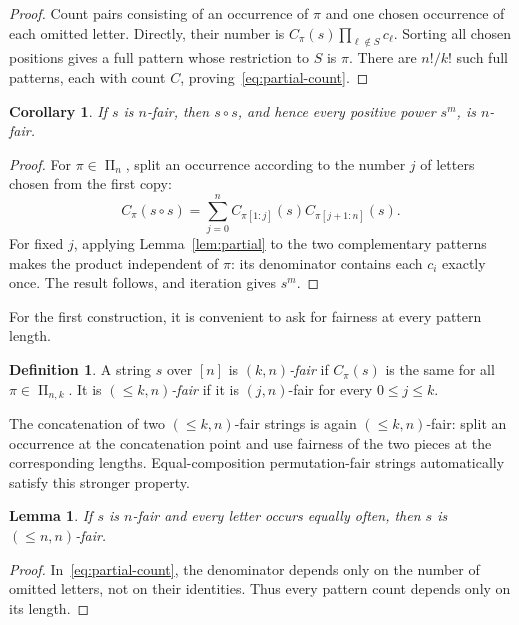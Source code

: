\documentclass[11pt]{article}
\newtheorem{lemma}[theorem]{Lemma}
\newtheorem{corollary}[theorem]{Corollary}
\theoremstyle{definition}
\newtheorem{definition}[theorem]{Definition}
\theoremstyle{remark}
\newcommand{\PiSet}{\mathop{\Pi}}
\newcommand{\concat}{\mathbin{\circ}}
\begin{document}
\begin{proof}
Count pairs consisting of an occurrence of \(\pi\) and one chosen occurrence
of each omitted letter.  Directly, their number is
\(C_\pi(s)\prod_{\ell\notin S}c_\ell\).  Sorting all chosen positions gives a
full pattern whose restriction to \(S\) is \(\pi\).  There are \(n!/k!\) such
full patterns, each with count \(C\), proving~\eqref{eq:partial-count}.
\end{proof}

\begin{corollary}\label{cor:self-concat}
If \(s\) is \(n\)-fair, then \(s\concat s\), and hence every positive power
\(s^m\), is \(n\)-fair.
\end{corollary}

\begin{proof}
For \(\pi\in\PiSet_n\), split an occurrence according to the number \(j\) of
letters chosen from the first copy:
\[
  C_\pi(s\concat s)
  =\sum_{j=0}^n C_{\pi[1:j]}(s)C_{\pi[j+1:n]}(s).
\]
For fixed \(j\), applying Lemma~\ref{lem:partial} to the two complementary
patterns makes the product independent of \(\pi\): its denominator contains
each \(c_i\) exactly once.  The result follows, and iteration gives \(s^m\).
\end{proof}

For the first construction, it is convenient to ask for fairness at every
pattern length.

\begin{definition}
A string \(s\) over \([n]\) is \emph{\((k,n)\)-fair} if \(C_\pi(s)\) is the
same for all \(\pi\in\PiSet_{n,k}\).  It is \emph{\((\leq k,n)\)-fair} if it
is \((j,n)\)-fair for every \(0\leq j\leq k\).
\end{definition}

The concatenation of two \((\leq k,n)\)-fair strings is again
\((\leq k,n)\)-fair: split an occurrence at the concatenation point and use
fairness of the two pieces at the corresponding lengths.  Equal-composition
permutation-fair strings automatically satisfy this stronger property.

\begin{lemma}\label{lem:equal-full-to-partial}
If \(s\) is \(n\)-fair and every letter occurs equally often, then \(s\) is
\((\leq n,n)\)-fair.
\end{lemma}

\begin{proof}
In~\eqref{eq:partial-count}, the denominator depends only on the number of
omitted letters, not on their identities.  Thus every pattern count depends
only on its length.
\end{proof}
\end{document}
